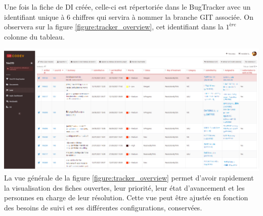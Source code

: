 Une fois la fiche de DI créée, celle-ci est répertoriée dans le BugTracker avec un identifiant unique à 6 chiffres qui servira à nommer la branche GIT associée. On observera sur la figure \ref{figure:tracker_overview}, cet identifiant dans la $1^{ère}$ colonne du tableau.\\ \vspace*{0.3cm}

\includegraphics[width=16cm]{pictures/tracker_overview.png}\vspace*{0.1cm}
\vspace*{0.3cm}
La vue générale de la figure \ref{figure:tracker_overview} permet d'avoir rapidement la visualisation des fiches ouvertes, leur priorité, leur état d'avancement et les personnes en charge de leur résolution. Cette vue peut être ajustée en fonction des besoins de suivi et ses différentes configurations, conservées.

